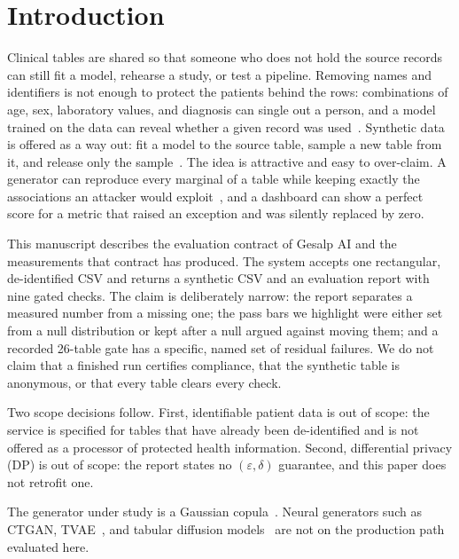 \documentclass[11pt,a4paper]{article}
\begin{document}
\section{Introduction}\label{sec:intro}

Clinical tables are shared so that someone who does not hold the source records can still fit a model, rehearse a study, or test a pipeline. Removing names and identifiers is not enough to protect the patients behind the rows: combinations of age, sex, laboratory values, and diagnosis can single out a person, and a model trained on the data can reveal whether a given record was used~\cite{shokri2017,stadler2022}. Synthetic data is offered as a way out: fit a model to the source table, sample a new table from it, and release only the sample~\cite{jordon2022}. The idea is attractive and easy to over-claim. A generator can reproduce every marginal of a table while keeping exactly the associations an attacker would exploit~\cite{stadler2022}, and a dashboard can show a perfect score for a metric that raised an exception and was silently replaced by zero.

This manuscript describes the evaluation contract of Gesalp AI and the measurements that contract has produced. The system accepts one rectangular, de-identified CSV and returns a synthetic CSV and an evaluation report with nine gated checks. The claim is deliberately narrow: the report separates a measured number from a missing one; the pass bars we highlight were either set from a null distribution or kept after a null argued against moving them; and a recorded 26-table gate has a specific, named set of residual failures. We do not claim that a finished run certifies compliance, that the synthetic table is anonymous, or that every table clears every check.

Two scope decisions follow. First, identifiable patient data is out of scope: the service is specified for tables that have already been de-identified and is not offered as a processor of protected health information. Second, differential privacy (DP) is out of scope: the report states no $(\varepsilon,\delta)$ guarantee, and this paper does not retrofit one.

The generator under study is a Gaussian copula~\cite{sklar1959,patki2016}. Neural generators such as CTGAN, TVAE~\cite{xu2019}, and tabular diffusion models~\cite{kotelnikov2023} are not on the production path evaluated here.
\end{document}
